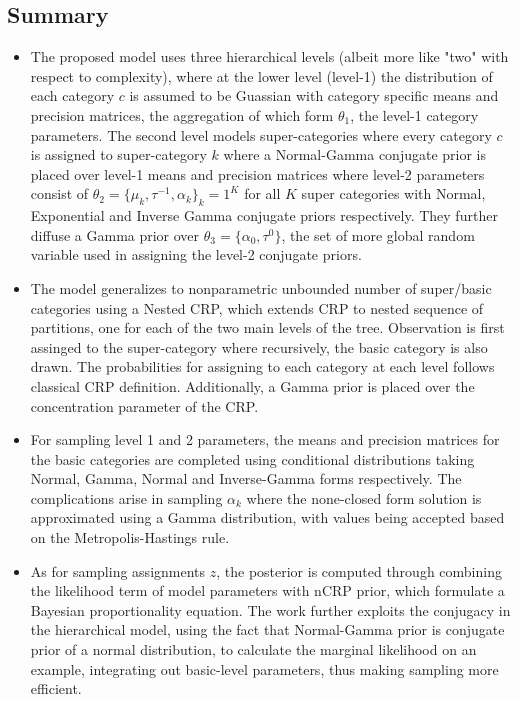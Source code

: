 \documentclass{article}
\begin{document}
\subsection{Summary}
\begin{itemize}
    \item The proposed model uses three hierarchical levels (albeit more like "two" with respect to complexity), where at the lower level (level-1) the distribution of each category $c$ is assumed to be Guassian with category specific means and precision matrices, the aggregation of which form $\theta_1$, the level-1 category parameters. The second level models super-categories where every category $c$ is assigned to super-category $k$ where a Normal-Gamma conjugate prior is placed over level-1 means and precision matrices where level-2 parameters consist of $\theta_2 = \{ \mu_k, \tau^{-1}, \alpha_k \}_k=1^K$ for all $K$ super categories with Normal, Exponential and Inverse Gamma conjugate priors respectively. They further diffuse a Gamma prior over $\theta_3 = \{ \alpha_0, \tau^0\}$, the set of more global random variable used in assigning the level-2 conjugate priors.
    \item The model generalizes to nonparametric unbounded number of super/basic categories using a Nested CRP, which extends CRP to nested sequence of partitions, one for each of the two main levels of the tree. Observation is first assinged to the super-category where recursively, the basic category is also drawn. The probabilities for assigning to each category at each level follows classical CRP definition. Additionally, a Gamma prior is placed over the concentration parameter of the CRP.
    \item For sampling level 1 and 2 parameters, the means and precision matrices for the basic categories are completed using conditional distributions taking Normal, Gamma, Normal and Inverse-Gamma forms respectively. The complications arise in sampling $\alpha_k$ where the none-closed form solution is approximated using a Gamma distribution, with values being accepted based on the Metropolis-Hastings rule.
    \item As for sampling assignments $z$, the posterior is computed through combining the likelihood term of model parameters with nCRP prior, which formulate a Bayesian proportionality equation. The work further exploits the conjugacy in the hierarchical model, using the fact that Normal-Gamma prior is conjugate prior of a normal distribution, to calculate the marginal likelihood on an example, integrating out basic-level parameters, thus making sampling more efficient.

\end{itemize}
\end{document}
